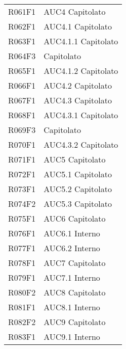 \documentclass[../analisi-dei-requisiti.tex]{subfiles}
\begin{document}
\begin{longtable}[H]{ p{4cm} | p{4cm} }
  R061F1                               & AUC4 Capitolato               \\
  R062F1                               & AUC4.1 Capitolato             \\
  R063F1                               & AUC4.1.1 Capitolato           \\
  R064F3                               & Capitolato                    \\
  R065F1                               & AUC4.1.2 Capitolato           \\
  R066F1                               & AUC4.2 Capitolato             \\
  R067F1                               & AUC4.3 Capitolato             \\
  R068F1                               & AUC4.3.1 Capitolato           \\
  R069F3                               & Capitolato                    \\
  R070F1                               & AUC4.3.2 Capitolato           \\
  R071F1                               & AUC5 Capitolato               \\
  R072F1                               & AUC5.1 Capitolato             \\
  R073F1                               & AUC5.2 Capitolato             \\
  R074F2                               & AUC5.3 Capitolato             \\
  R075F1                               & AUC6 Capitolato               \\
  R076F1                               & AUC6.1 Interno                \\
  R077F1                               & AUC6.2 Interno                \\
  R078F1                               & AUC7 Capitolato               \\
  R079F1                               & AUC7.1 Interno                \\
  R080F2                               & AUC8 Capitolato               \\
  R081F1                               & AUC8.1 Interno                \\
  R082F2                               & AUC9 Capitolato               \\
  R083F1                               & AUC9.1 Interno                \\

\end{longtable}
\end{document}
